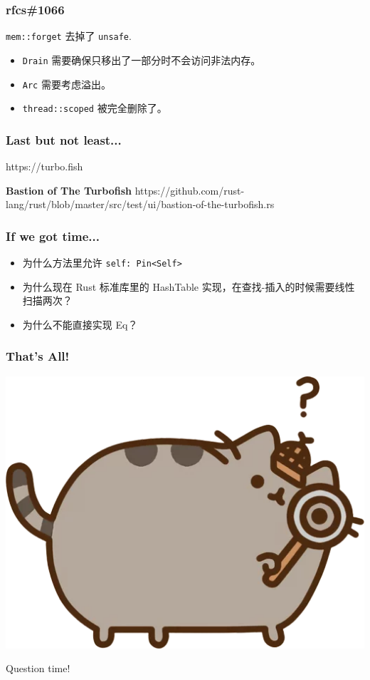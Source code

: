 \documentclass[UTF-8]{ctexbeamer}
\begin{document}
\begin{frame}
  \frametitle{rfcs\#1066}
  \texttt{mem::forget} 去掉了 \texttt{unsafe}.

  \pause

  \begin{itemize}
    \item \texttt{Drain} 需要确保只移出了一部分时不会访问非法内存。
    \item \texttt{Arc} 需要考虑溢出。
    \item \texttt{thread::scoped} 被完全删除了。
  \end{itemize}
\end{frame}

\begin{frame}
  \frametitle{Last but not least...}

  https://turbo.fish

  \pause

  \textbf{Bastion of The Turbofish}
  https://github.com/rust-lang/rust/blob/master/src/test/ui/bastion-of-the-turbofish.rs
\end{frame}

\begin{frame}
  \frametitle{If we got time...}

  \begin{itemize}
    \item 为什么方法里允许 \texttt{self: Pin<Self>}
    \item 为什么现在 Rust 标准库里的 HashTable 实现，在查找-插入的时候需要线性扫描两次？
    \item 为什么不能直接实现 Eq？
  \end{itemize}
\end{frame}

\begin{frame}
  \frametitle{That's All!}

  \begin{center}
    \includegraphics[width=.5\textwidth]{assets/look.png}

    Question time!
  \end{center}
\end{frame}
\end{document}
